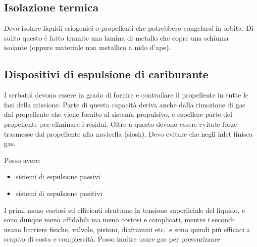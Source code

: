     \subsection{Isolazione termica}
    Devo isolare liquidi criogenici o propellenti che potrebbero congelarsi in orbita. 
    Di solito questo è fatto tramite una lamina di metallo che copre una schiuma isolante (oppure materiale non metallico a nido d'ape).
    \subsection{Dispositivi di espulsione di cariburante}
    I serbatoi devono essere in grado di fornire e controllare il propellente in tutte le fasi della missione. 
    Parte di questa capacità deriva anche dalla rimozione di gas dal propellente che viene fornito al sistema propulsivo, e 
    espellere parte del propellente per eliminare i residui. Oltre a questo devono essere evitate forze trasmesse dal propellente alla navicella
    (slosh). Devo evitare che negli inlet finisca gas. 
    
    Posso avere: 
    \begin{itemize}
        \item sistemi di espulsione passivi
        \item sistemi di espulsione positivi
    \end{itemize}
    I primi meno costosi ed efficienti sfruttano la tensione superficiale del liquido, e sono dunque meno affidabili ma meno costosi e complicati, mentre i secondi usano barriere fisiche, valvole, pistoni, diaframmi etc.\ e sono quindi più efficaci a scapito di costo e complessità.
    Posso inoltre usare gas per pressurizzare 
    